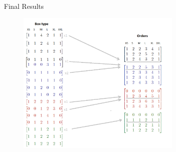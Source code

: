 \begin{frame}{Final Results}
    \begin{figure}
        \centering
        \includegraphics[width=8cm]{./figures/boxtypes.png}        \label{fig:my_label}
    \end{figure}
\end{frame}
